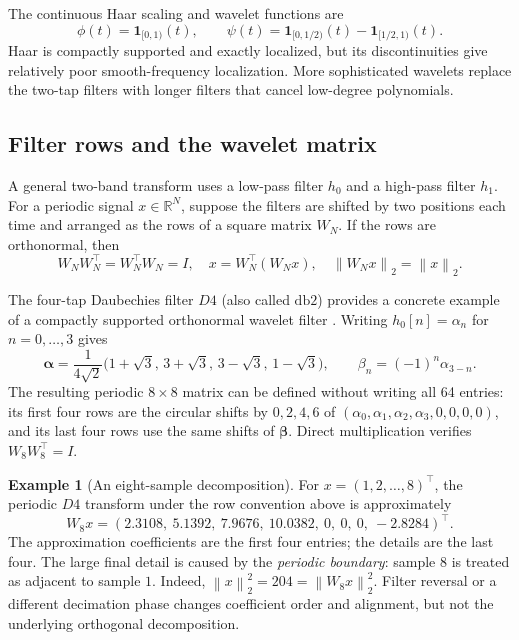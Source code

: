 \documentclass{article}
\theoremstyle{definition}
\newtheorem{example}[theorem]{Example}
\theoremstyle{remark}
\newcommand{\R}{\mathbb R}
\newcommand{\norm}[1]{\left\lVert#1\right\rVert}
\begin{document}
The continuous Haar scaling and wavelet functions are
\begin{equation}
\phi(t)=\mathbf 1_{[0,1)}(t),\qquad
\psi(t)=\mathbf 1_{[0,1/2)}(t)-\mathbf 1_{[1/2,1)}(t).
\end{equation}
Haar is compactly supported and exactly localized, but its discontinuities give relatively poor smooth-frequency localization. More sophisticated wavelets replace the two-tap filters with longer filters that cancel low-degree polynomials.

\subsection{Filter rows and the wavelet matrix}
A general two-band transform uses a low-pass filter $h_0$ and a high-pass filter $h_1$. For a periodic signal $x\in\R^N$, suppose the filters are shifted by two positions each time and arranged as the rows of a square matrix $W_N$. If the rows are orthonormal, then
\begin{equation}
W_NW_N^\top=W_N^\top W_N=I,
\quad x=W_N^\top(W_Nx),
\quad \norm{W_Nx}_2=\norm{x}_2.
\label{eq:matrixenergy}
\end{equation}

The four-tap Daubechies filter $D4$ (also called $\mathrm{db}2$) provides a concrete example of a compactly supported orthonormal wavelet filter \cite{daubechies1992}. Writing $h_0[n]=\alpha_n$ for $n=0,\ldots,3$ gives
\begin{equation}
\boldsymbol\alpha=\frac{1}{4\sqrt2}\bigl(1+\sqrt3,\,3+\sqrt3,\,3-\sqrt3,\,1-\sqrt3\bigr),
\qquad \beta_n=(-1)^n\alpha_{3-n}.
\label{eq:d4}
\end{equation}
The resulting periodic $8\times8$ matrix can be defined without writing all 64 entries: its first four rows are the circular shifts by $0,2,4,6$ of $(\alpha_0,\alpha_1,\alpha_2,\alpha_3,0,0,0,0)$, and its last four rows use the same shifts of $\boldsymbol\beta$. Direct multiplication verifies $W_8W_8^\top=I$.

\begin{example}[An eight-sample decomposition]
For $x=(1,2,\ldots,8)^\top$, the periodic $D4$ transform under the row convention above is approximately
\begin{equation}
W_8x=(2.3108,\ 5.1392,\ 7.9676,\ 10.0382,\ 0,\ 0,\ 0,\ -2.8284)^\top.
\label{eq:d4numerical}
\end{equation}
The approximation coefficients are the first four entries; the details are the last four. The large final detail is caused by the \emph{periodic boundary}: sample $8$ is treated as adjacent to sample $1$. Indeed, $\norm{x}_2^2=204=\norm{W_8x}_2^2$. Filter reversal or a different decimation phase changes coefficient order and alignment, but not the underlying orthogonal decomposition.
\end{example}
\end{document}
